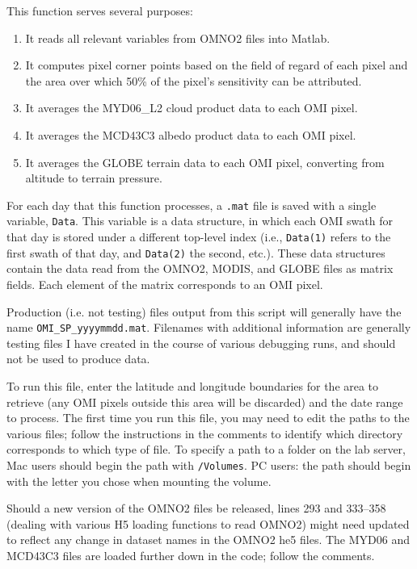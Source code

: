 \documentclass[12pt]{article}
\begin{document}
	 This function serves several purposes: 
		\begin{enumerate}
 		 \item It reads all relevant variables from OMNO2 files into Matlab.
 		 \item It computes pixel corner points based on the field of regard of each pixel and the area over which 50\% of the pixel's sensitivity can be attributed.
		 \item It averages the MYD06\_L2 cloud product data to each OMI pixel.
		 \item It averages the MCD43C3 albedo product data to each OMI pixel.
		 \item It averages the GLOBE terrain data to each OMI pixel, converting from altitude to terrain pressure.
		\end{enumerate}
	For each day that this function processes, a \texttt{.mat} file is saved with a single variable, \texttt{Data}.  This variable is a data structure, in which each OMI swath for that day is stored under a different top-level index (i.e., \texttt{Data(1)} refers to the first swath of that day, and \texttt{Data(2)} the second, etc.).  These data structures contain the data read from the OMNO2, MODIS, and GLOBE files as matrix fields.  Each element of the matrix corresponds to an OMI pixel.
	
	Production (i.e. not testing) files output from this script will generally have the name \texttt{OMI\_SP\_yyyymmdd.mat}.  Filenames with additional information are generally testing files I have created in the course of various debugging runs, and should not be used to produce  data.
	
	To run this file, enter the latitude and longitude boundaries for the area to retrieve (any OMI pixels outside this area will be discarded) and the date range to process.  The first time you run this file, you may need to edit the paths to the various files; follow the instructions in the comments to identify which directory corresponds to which type of file.  To specify a path to a folder on the lab server, Mac users should begin the path with \texttt{/Volumes}.  PC users: the path should begin with the letter you chose when mounting the volume.
	
	Should a new version of the OMNO2 files be released, lines 293 and 333--358 (dealing with various H5 loading functions to read OMNO2) might need updated to reflect any change in dataset names in the OMNO2 he5 files.  The MYD06 and MCD43C3 files are loaded further down in the code; follow the comments. 
	
\end{document}
